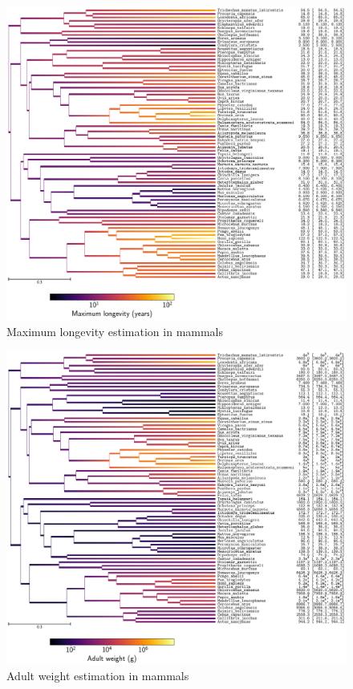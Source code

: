 \documentclass{article}
\begin{document}
	\begin{figure}[H]
		\centering
		\includegraphics[width=\linewidth, page=1]{mammals/18CDS_SiteMutSelBranchNe_R1_LogMaximum_longevity}
		\caption[Maximum longevity estimation in mammals]{Maximum longevity estimation in mammals}
	\end{figure}

	\begin{figure}[H]
		\centering
		\includegraphics[width=\linewidth, page=1]{mammals/18CDS_SiteMutSelBranchNe_R1_LogAdult_weight}
		\caption[Adult weight estimation in mammals]{Adult weight estimation in mammals}
	\end{figure}
\end{document}
